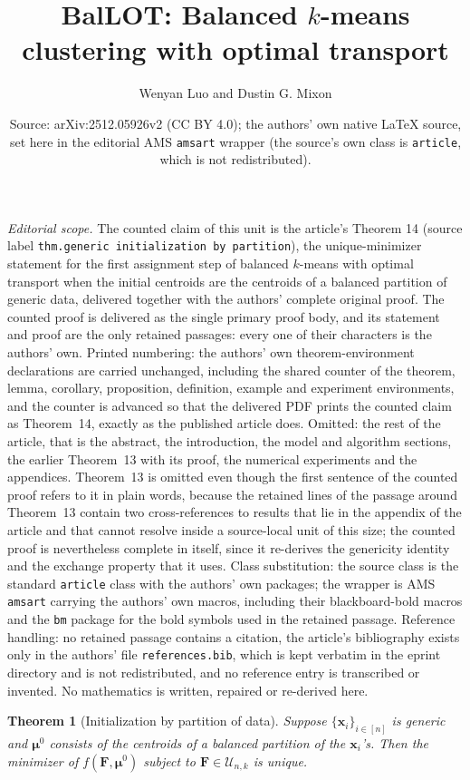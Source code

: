 \documentclass[10pt,a4paper]{amsart}
\title{BalLOT: Balanced $k$-means clustering with optimal transport}
\author{Wenyan Luo and Dustin G. Mixon}
\date{Source: arXiv:2512.05926v2 (CC BY 4.0); the authors' own native \LaTeX{} source, set here in the editorial AMS \texttt{amsart} wrapper (the source's own class is \texttt{article}, which is not redistributed).}
\newcommand{\bUnk}{\mathcal{U}_{n,k}}
\newcommand{\bmF}{\bm{F}}
\newcommand{\bmu}{\bm{\mu}}
\theoremstyle{plain}
\newtheorem{theorem}{Theorem}
\theoremstyle{definition}
\begin{document}
\maketitle
\noindent\textit{Editorial scope.} The counted claim of this unit is the article's Theorem 14 (source label \texttt{thm.generic initialization by partition}), the unique-minimizer statement for the first assignment step of balanced $k$-means with optimal transport when the initial centroids are the centroids of a balanced partition of generic data, delivered together with the authors' complete original proof. The counted proof is delivered as the single primary proof body, and its statement and proof are the only retained passages: every one of their characters is the authors' own. Printed numbering: the authors' own theorem-environment declarations are carried unchanged, including the shared counter of the theorem, lemma, corollary, proposition, definition, example and experiment environments, and the counter is advanced so that the delivered PDF prints the counted claim as Theorem~14, exactly as the published article does. Omitted: the rest of the article, that is the abstract, the introduction, the model and algorithm sections, the earlier Theorem~13 with its proof, the numerical experiments and the appendices. Theorem~13 is omitted even though the first sentence of the counted proof refers to it in plain words, because the retained lines of the passage around Theorem~13 contain two cross-references to results that lie in the appendix of the article and that cannot resolve inside a source-local unit of this size; the counted proof is nevertheless complete in itself, since it re-derives the genericity identity and the exchange property that it uses. Class substitution: the source class is the standard \texttt{article} class with the authors' own packages; the wrapper is AMS \texttt{amsart} carrying the authors' own macros, including their blackboard-bold macros and the \texttt{bm} package for the bold symbols used in the retained passage. Reference handling: no retained passage contains a citation, the article's bibliography exists only in the authors' file \texttt{references.bib}, which is kept verbatim in the eprint directory and is not redistributed, and no reference entry is transcribed or invented. No mathematics is written, repaired or re-derived here.
\setcounter{theorem}{13}
\begin{theorem}[Initialization by partition of data]\label{thm.generic initialization by partition}
Suppose $\{\bm{x}_i\}_{i\in[n]}$ is generic and $\bmu^0$ consists of the centroids of a balanced partition of the $\bm{x}_i$'s.
Then the minimizer of $f(\bmF,\bmu^0)$ subject to $\bmF\in\bUnk$ is unique.
\end{theorem}
\end{document}
